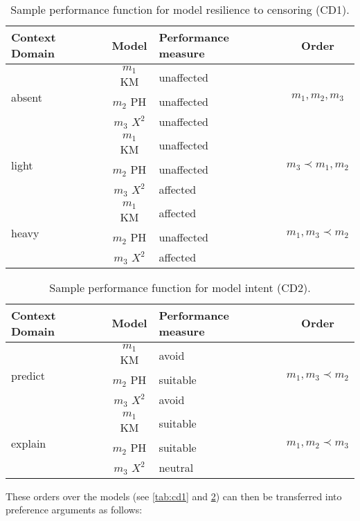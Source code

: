 \begin{table}[t]
	\centering
	\begin{tabular}{|l|c|l|c|}
	\hline
	Context Domain 			& Model 			& Performance measure & Order\\
	\hline\hline
	\multirow{3}{*}{absent} & $m_1$ KM 		& unaffected		& 	\multirow{3}{*}{$m_1, m_2, m_3$}\\
							& $m_2$ PH		& unaffected		&\\
							& $m_3$ $X^2$	& unaffected		&\\
	\hline
	\multirow{3}{*}{light} 	& $m_1$ KM 		& unaffected		& \multirow{3}{*}{$m_3 \prec m_1, m_2$}\\
							& $m_2$ PH		& unaffected		&\\
							& $m_3$ $X^2$	& affected		&\\
	\hline
	\multirow{3}{*}{heavy} 	& $m_1$ KM 		& affected		& \multirow{3}{*}{$m_1, m_3 \prec m_2$}\\
							& $m_2$ PH		& unaffected		&\\
							& $m_3$ $X^2$	& affected		&\\
	\hline
	\end{tabular}
	\caption{Sample performance function for model resilience to censoring (CD1).}
	\label{tab:cd1}
\end{table}


\begin{table}[b]
	\centering
	\begin{tabular}{|l|c|l|c|}
	\hline
	Context Domain 			& Model 			& Performance measure & Order\\
	\hline\hline
	\multirow{3}{*}{predict}& $m_1$ KM 		& avoid		& \multirow{3}{*}{$m_1, m_3 \prec m_2$}\\
							& $m_2$ PH		& suitable	&\\
							& $m_3$ $X^2$	& avoid		&\\
	\hline
	\multirow{3}{*}{explain}& $m_1$ KM 		& suitable	& \multirow{3}{*}{$m_1, m_2 \prec m_3$}\\
							& $m_2$ PH		& suitable	&\\
							& $m_3$ $X^2$	& neutral	&\\
	\hline
	\end{tabular}
	\caption{Sample performance function for model intent (CD2).}
	\label{tab:cd2}
\end{table}

These orders over the models (see \autoref{tab:cd1} and \ref{tab:cd2}) can then be transferred into preference arguments as follows:

